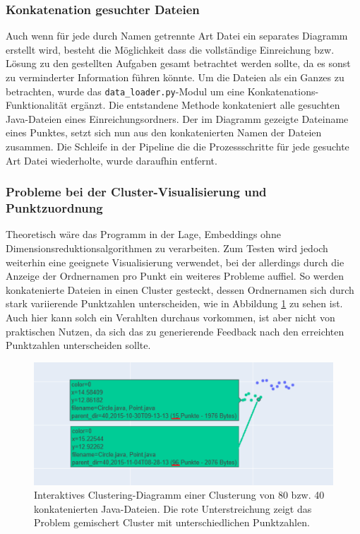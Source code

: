 \subsubsection*{Konkatenation gesuchter Dateien}
Auch wenn für jede durch Namen getrennte Art Datei ein separates Diagramm erstellt wird, besteht die Möglichkeit dass die vollständige Einreichung bzw. Lösung zu den gestellten Aufgaben gesamt betrachtet werden sollte, da es sonst zu verminderter Information führen könnte. Um die Dateien als ein Ganzes zu betrachten, wurde das \texttt{data\_loader.py}-Modul um eine Konkatenations-Funktionalität ergänzt. Die entstandene Methode konkateniert alle gesuchten Java-Dateien eines Einreichungsordners. Der im Diagramm gezeigte Dateiname eines Punktes, setzt sich nun aus den konkatenierten Namen der Dateien zusammen. Die Schleife in der Pipeline die die Prozessschritte für jede gesuchte Art Datei wiederholte, wurde daraufhin entfernt.


\subsubsection*{Probleme bei der Cluster-Visualisierung und Punktzuordnung}
Theoretisch wäre das Programm in der Lage, Embeddings ohne Dimensionsreduktionsalgorithmen zu verarbeiten. Zum Testen wird jedoch weiterhin eine geeignete Visualisierung verwendet, bei der allerdings durch die Anzeige der Ordnernamen pro Punkt ein weiteres Probleme auffiel. So werden konkatenierte Dateien in einen Cluster gesteckt, dessen Ordnernamen sich durch stark variierende Punktzahlen unterscheiden, wie in Abbildung \ref{abb:C-40-K-Pg} zu sehen ist. Auch hier kann solch ein Verahlten durchaus vorkommen, ist aber nicht von praktischen Nutzen, da sich das zu generierende Feedback nach den erreichten Punktzahlen unterscheiden sollte. 

\begin{figure} %
	\centering
	\includegraphics[width=1.0\textwidth]{images/Clusterung - 40 - Konkateniert - Punktzahl gemischt.pdf}
	\caption{Interaktives Clustering-Diagramm einer Clusterung von 80 bzw. 40 konkatenierten Java-Dateien. Die rote Unterstreichung zeigt das Problem gemischert Cluster mit unterschiedlichen Punktzahlen.}
	\label{abb:C-40-K-Pg}
\end{figure}


